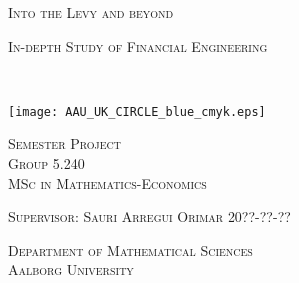 \begin{titlingpage}
\newcommand\stext[1]{\an{\scshape#1}}
  \thispagestyle{empty}
  \centering
  \par\vspace*{2\onelineskip}
  { \setlength{\baselineskip}{24pt}
    {\Huge \textsc{Into the Levy and beyond}}

	  \Large \textsc{In-depth Study of Financial Engineering}}\\
    \par\vspace*{3\onelineskip}
    \par
    \texttt{[image: AAU\_UK\_CIRCLE\_blue\_cmyk.eps]}
    \par\vspace*{4\onelineskip}
    \large\textsc{Semester Project}\\
    \Large\textsc{Group 5.240}\\
    \Large\textsc{MSc in Mathematics-Economics}
  \par\vspace*{2\onelineskip}
  \large\textsc{Supervisor: Sauri Arregui Orimar}\hfill
  \large\textsc{20??-??-??}
  \par\vspace*{2\onelineskip}
  \small
  \large\textsc{Department of Mathematical Sciences}\\
  \large\textsc{Aalborg University}
  \enlargethispage{2\onelineskip}
  
\nopagebreak
\end{titlingpage}
